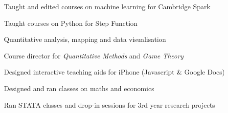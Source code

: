 \documentclass[a4paper,nomath]{deedy-resume} %
\begin{document}
\begin{minipage}[t]{0.66\textwidth}
\begin{tightitemize}
    \end{tightitemize}
    
    \sectionspace %

    \begin{tightitemize}
    	\item Taught and edited courses on machine learning for Cambridge Spark
		\item Taught courses on Python for Step Function
    	
    \end{tightitemize}
    
    \sectionspace %
    
    
        \begin{tightitemize}
        	\item Quantitative analysis, mapping and data visualisation
    		
        	
        \end{tightitemize}
        
        \sectionspace %


    \begin{tightitemize}
    	\item Course director for \textit{Quantitative Methods} and \textit{Game Theory}
		\item Designed interactive teaching aids for iPhone (Javascript \& Google Docs)
    	
    \end{tightitemize}
    
    \sectionspace %


    
    \begin{tightitemize}
    	\item Designed and ran classes on maths and economics
		\item Ran STATA classes and drop-in sessions for 3rd year research projects
    	

\end{tightitemize}
\end{minipage}
\end{document}
